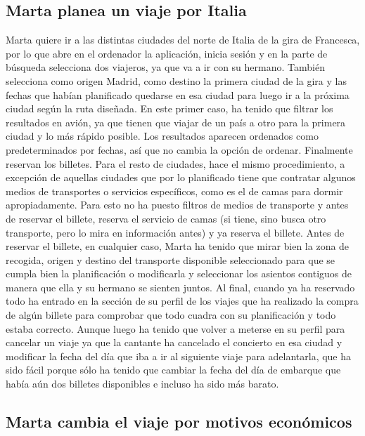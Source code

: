 \subsection{Marta planea un viaje por Italia}

Marta quiere ir a las distintas ciudades del norte de Italia de la gira de Francesca, por lo que abre en el ordenador la aplicación, inicia sesión y en la parte de búsqueda selecciona dos viajeros, ya que va a ir con su hermano. También selecciona como origen Madrid, como destino la primera ciudad de la gira y las fechas que habían planificado quedarse en esa ciudad para luego ir a la próxima ciudad según la ruta diseñada. En este primer caso, ha tenido que filtrar los resultados en avión, ya que tienen que viajar de un país a otro para la primera ciudad y lo más rápido posible. Los resultados aparecen ordenados como predeterminados por fechas, así que no cambia la opción de ordenar. Finalmente reservan los billetes.
Para el resto de ciudades, hace el mismo procedimiento, a excepción de aquellas ciudades que por lo planificado tiene que contratar algunos medios de transportes o servicios específicos, como es el de camas para dormir apropiadamente. Para esto no ha puesto filtros de medios de transporte y antes de reservar el billete, reserva el servicio de camas (si tiene, sino busca otro transporte, pero lo mira en información antes) y ya reserva el billete.
Antes de reservar el billete, en cualquier caso, Marta ha tenido que mirar bien la zona de recogida, origen y destino del transporte disponible seleccionado para que se cumpla bien la planificación o modificarla y seleccionar los asientos contiguos de manera que ella y su hermano se sienten juntos.
Al final, cuando ya ha reservado todo ha entrado en la sección de su perfil de los viajes que ha realizado la compra de algún billete para comprobar que todo cuadra con su planificación y todo estaba correcto. Aunque luego ha tenido que volver a meterse en su perfil para cancelar un viaje ya que la cantante ha cancelado el concierto en esa ciudad y modificar la fecha del día que iba a ir al siguiente viaje para adelantarla, que ha sido fácil porque sólo ha tenido que cambiar la fecha del día de embarque que había aún dos billetes disponibles e incluso ha sido más barato.

\subsection{Marta cambia el viaje por motivos económicos}

